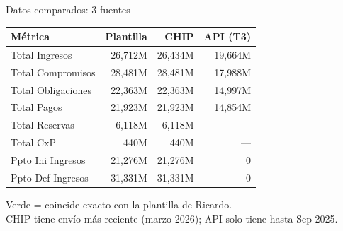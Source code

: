 \documentclass[aspectratio=169,11pt]{beamer}
\begin{document}
\begin{frame}{Datos comparados: 3 fuentes}
\footnotesize
\begin{center}
\renewcommand{\arraystretch}{1.15}
\begin{tabular}{l r r r}
\toprule
\textbf{M\'etrica} & \textbf{Plantilla} & \textbf{CHIP} & \textbf{API (T3)} \\
\midrule
Total Ingresos & 26,712M & 26,434M & 19,664M \\
Total Compromisos & 28,481M & \textcolor{verde}{28,481M} & 17,988M \\
Total Obligaciones & 22,363M & \textcolor{verde}{22,363M} & 14,997M \\
Total Pagos & 21,923M & \textcolor{verde}{21,923M} & 14,854M \\
Total Reservas & 6,118M & \textcolor{verde}{6,118M} & --- \\
Total CxP & 440M & \textcolor{verde}{440M} & --- \\
Ppto Ini Ingresos & 21,276M & \textcolor{verde}{21,276M} & 0 \\
Ppto Def Ingresos & 31,331M & \textcolor{verde}{31,331M} & 0 \\
\bottomrule
\end{tabular}
\end{center}
\vspace{4pt}
\textcolor{sepia}{\scriptsize \textcolor{verde}{Verde} = coincide exacto con la plantilla de Ricardo. \\
CHIP tiene envío m\'as reciente (marzo 2026); API solo tiene hasta Sep 2025.}
\end{frame}
\end{document}

